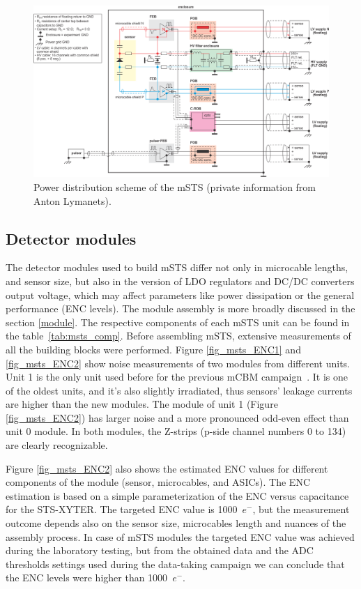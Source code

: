 \begin{figure}[!h]
\centering
\includegraphics[width=0.95\columnwidth]{Chapter6/DCS/images/power_distribution.png}
\caption{Power distribution scheme of the \gls{mSTS} (private information from Anton Lymanets).}
\label{fig_msts_power}
\end{figure}
\newpage

\subsection{Detector modules}
 The detector modules used to build \gls{mSTS} differ not only in microcable lengths, and sensor size, but also in the version of \gls{LDO} regulators and DC/DC converters output voltage, which may affect parameters like power dissipation or the general performance (ENC levels). The module assembly is more broadly discussed in the section \ref{module}. The respective components of each \gls{mSTS} unit can be found in the table~\ref{tab:msts_comp}. Before assembling \gls{mSTS}, extensive measurements of all the building blocks were performed. Figure \ref{fig_msts_ENC1} and  \ref{fig_msts_ENC2} show noise measurements of two modules from different units. Unit 1 is the only unit used before for the previous \gls{mCBM} campaign~\cite{heuser1}. It is one of the oldest units, and it's also slightly irradiated, thus sensors' leakage currents are higher than the new modules. The module of unit 1 (Figure \ref{fig_msts_ENC2}) has larger noise and a more pronounced odd-even effect than unit 0 module. In both modules, the Z-strips (p-side channel numbers 0 to 134) are clearly recognizable. 

Figure \ref{fig_msts_ENC2} also shows the estimated ENC values for different components of the module (sensor, microcables, and \gls{ASIC}s). The \gls{ENC} estimation is based on a simple parameterization of the \gls{ENC} versus capacitance for the STS-XYTER. The targeted \gls{ENC} value is 1000~$e^{-}$, but the measurement outcome depends also on the sensor size, microcables length and nuances of the assembly process. In case of \gls{mSTS} modules the targeted \gls{ENC} value was achieved during the laboratory testing, but from the obtained data and the \gls{ADC} thresholds settings used during the data-taking campaign we can conclude that the \gls{ENC} levels were higher than 1000~$e^{-}$.\newpage


